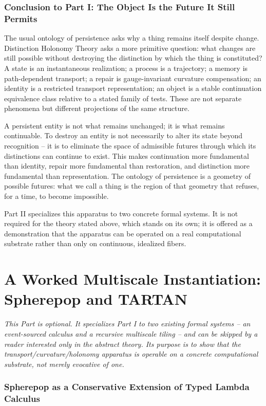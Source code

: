 \documentclass[11pt]{article}
\begin{document}
\section{Conclusion to Part I: The Object Is the Future It Still Permits}

The usual ontology of persistence asks why a thing remains itself despite change. Distinction Holonomy Theory asks a more primitive question: what changes are still possible without destroying the distinction by which the thing is constituted? A state is an instantaneous realization; a process is a trajectory; a memory is path-dependent transport; a repair is gauge-invariant curvature compensation; an identity is a restricted transport representation; an object is a stable continuation equivalence class relative to a stated family of tests. These are not separate phenomena but different projections of the same structure.

A persistent entity is not what remains unchanged; it is what remains continuable. To destroy an entity is not necessarily to alter its state beyond recognition -- it is to eliminate the space of admissible futures through which its distinctions can continue to exist. This makes continuation more fundamental than identity, repair more fundamental than restoration, and distinction more fundamental than representation. The ontology of persistence is a geometry of possible futures: what we call a thing is the region of that geometry that refuses, for a time, to become impossible.

Part II specializes this apparatus to two concrete formal systems. It is not required for the theory stated above, which stands on its own; it is offered as a demonstration that the apparatus can be operated on a real computational substrate rather than only on continuous, idealized fibers.

\part{A Worked Multiscale Instantiation: Spherepop and TARTAN}

\noindent\emph{This Part is optional. It specializes Part I to two existing formal systems -- an event-sourced calculus and a recursive multiscale tiling -- and can be skipped by a reader interested only in the abstract theory. Its purpose is to show that the transport/curvature/holonomy apparatus is operable on a concrete computational substrate, not merely evocative of one.}

\section{Spherepop as a Conservative Extension of Typed Lambda Calculus}
\label{sec:sp-lambda}
\end{document}
